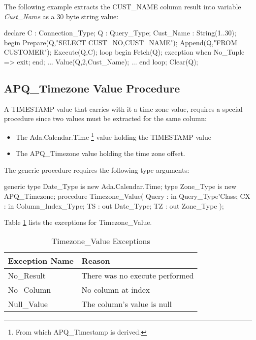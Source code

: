 \documentclass[english,letterpaper]{book}
\begin{document}
The following example extracts the CUST\_NAME column result into variable
\emph{Cust\_Name} as a 30 byte string value:

\begin{Example}
declare
   C :         Connection_Type;
   Q :         Query_Type;
   Cust_Name : String(1..30);
begin
   Prepare(Q,"SELECT CUST_NO,CUST_NAME");
   Append(Q,"FROM CUSTOMER");
   Execute(Q,C);
   loop
      begin
         Fetch(Q);
      exception
         when No_Tuple =>
            exit;
      end;
      ...
      Value(Q,2,Cust_Name);
      ...
   end loop;
   Clear(Q);
\end{Example}

\subsection{APQ\_Timezone Value Procedure}

A TIMESTAMP value that carries with it a time zone
value, requires a special procedure since two values must be extracted
for the same column:

\begin{itemize}
   \item The Ada.Calendar.Time%
      \footnote{From which APQ\_Timestamp is derived.} value holding the TIMESTAMP value
   \item The APQ\_Timezone value holding the time zone
      offset.
\end{itemize}

The generic procedure requires the following type arguments:

\begin{Code}
generic
   type Date_Type is new Ada.Calendar.Time;
   type Zone_Type is new APQ_Timezone;
procedure Timezone_Value(
   Query : in     Query_Type'Class;
   CX :    in     Column_Index_Type;
   TS :       out Date_Type;
   TZ :       out Zone_Type
);
\end{Code}

Table \ref{t:tzvx} lists the exceptions for Timezone\_Value.

\begin{table}
   \begin{center}
      \begin{tabular}{ll}
         Exception Name    &  Reason\\
         \hline 
         No\_Result        &  There was no execute performed\\
         No\_Column        &  No column at index\\
         Null\_Value       &  The column's value is null\\
      \end{tabular}
   \end{center}
   \caption{Timezone\_Value Exceptions}\label{t:tzvx}
\end{table}
\end{document}
